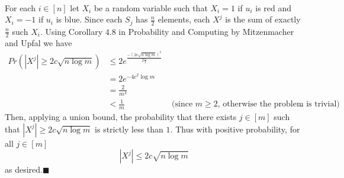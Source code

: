 \documentclass[letterpaper,12pt,oneside,onecolumn]{article}
\begin{document}
\paragraph{}
For each $i \in [n]$ let $X_i$ be a random variable such that $X_i = 1$ if $u_i$ is red and $X_i = -1$ if $u_i$ is  blue. Since each $S_j$ has $\frac{n}{2}$ elements, each $X^j$ is the sum of exactly $\frac{n}{2}$ such $X_i$. Using Corollary $4.8$ in Probability and Computing by Mitzenmacher and Upfal we have
\begin{align*}
Pr(|X^j| \geq 2c\sqrt{n\log m}) &\leq 2e^\frac{-(2c\sqrt{n\log m})^2}{2\frac{n}{2}} \\
&= 2e^{-4c^2\log m}\\
&=\frac{2}{m^4}\\
&< \frac{1}{m} &\text{ (since $m \geq 2$, otherwise the problem is trivial)}.
\end{align*}
Then, applying a union bound,  the probability that there exists $j\in[m]$ such that $|X^j| \geq 2c\sqrt{n\log m}$ is strictly less than $1$. Thus with positive probability, for all $j\in [m]$ $$|X^j| \leq 2c\sqrt{n\log m}$$
as desired.$\blacksquare$
\newpage
\section{}

\newpage
\section{}

\newpage
\section{}
\end{document}
